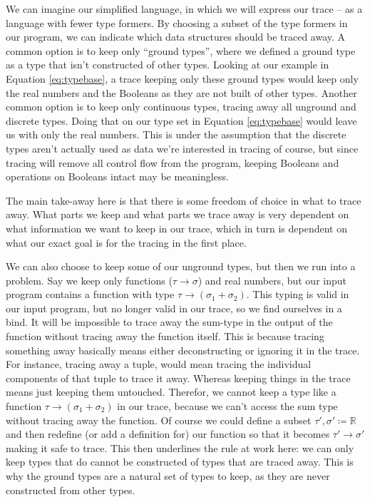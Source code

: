     We can imagine our simplified language, in which we will express our trace -- as a language with fewer type formers.
    By choosing a subset of the type formers in our program, we can indicate which data structures should be traced away.
    A common option is to keep only ``ground types'', where we defined a ground type as a type that isn't constructed of other types.
    Looking at our example in Equation \ref{eq:typebase}, a trace keeping only these ground types would keep only the real numbers and the Booleans as they are not built of other types.
    Another common option is to keep only continuous types, tracing away all unground and discrete types.
    Doing that on our type set in Equation \ref{eq:typebase} would leave us with only the real numbers.
    This is under the assumption that the discrete types aren't actually used as data we're interested in tracing of course, but since tracing will remove all control flow from the program, keeping Booleans and operations on Booleans intact may be meaningless. 

    The main take-away here is that there is some freedom of choice in what to trace away.
    What parts we keep and what parts we trace away is very dependent on what information we want to keep in our trace, which in turn is dependent on what our exact goal is for the tracing in the first place.
    
    We can also choose to keep some of our unground types, but then we run into a problem.
    Say we keep only functions ($\tau\to\sigma$) and real numbers, but our input program contains a function with type $\tau\to(\sigma_1+\sigma_2)$.
    This typing is valid in our input program, but no longer valid in our trace, so we find ourselves in a bind.
    It will be impossible to trace away the sum-type in the output of the function without tracing away the function itself.
    This is because tracing something away basically means either deconstructing or ignoring it in the trace.
    For instance, tracing away a tuple, would mean tracing the individual components of that tuple to trace it away.
    Whereas keeping things in the trace means just keeping them untouched.
    Therefor, we cannot keep a type like a function $\tau\to(\sigma_1+\sigma_2)$ in our trace, because we can't access the sum type without tracing away the function.
    Of course we could define a subset $\tau',\sigma'\coloneqq\mathbb{R}$ and then redefine (or add a definition for) our function so that it becomes $\tau'\to\sigma'$ making it safe to trace.
    This then underlines the rule at work here: we can only keep types that do cannot be constructed of types that are traced away.
    This is why the ground types are a natural set of types to keep, as they are never constructed from other types.
    
